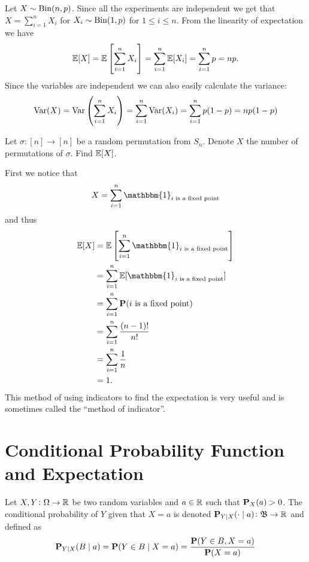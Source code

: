 \documentclass[11pt,a4paper]{article}
\begin{document}
  \begin{example}
    Let $X \sim \operatorname{Bin}(n,p)$. Since all the experiments are independent
    we get that $X = \sum_{i=1}^{n} X_i$ for $X_i \sim \operatorname{Bin}(1,p)$ for
    $1 \le i \le n$. From the linearity of expectation we have
    \[
      \mathbb{E}[X] =
      \mathbb{E}\left[\sum_{i=1}^{n} X_i\right] =
      \sum_{i=1}^{n} \mathbb{E}[X_i] =
      \sum_{i=1}^{n} p =
      np.
    \]
    Since the variables are independent we can also easily calculate
    the variance:
    \[
      \operatorname{Var}(X) =
      \operatorname{Var}\left(\sum_{i=1}^{n} X_i\right) =
      \sum_{i=1}^{n} \operatorname{Var}(X_i) =
      \sum_{i=1}^{n} p(1-p) =
      n p(1-p)
    \]
  \end{example}
  
  \begin{example}
    Let $\sigma \colon [n] \to [n]$ be a random permutation from $S_n$.
    Denote $X$ the number of permutations of $\sigma$. Find $\mathbb{E}[X]$.

    First we notice that
    \[
      X = \sum_{i=1}^{n} \mathbbm{1}_{i \text{ is a fixed point}}
    \]
    and thus
    \begin{align*}
      \E[X] &=
      \E\left[\sum_{i=1}^{n} \mathbbm{1}_{i \text{ is a fixed point}}\right] \\
      &= \sum_{i=1}^{n} \E[\mathbbm{1}_{i \text{ is a fixed point}}] \\
      &= \sum_{i=1}^{n} \Prob(i \text{ is a fixed point}) \\
      &= \sum_{i=1}^{n} \frac{(n-1)!}{n!} \\
      &= \sum_{i=1}^{n} \frac{1}{n} \\
      &= 1.
    \end{align*}
    This method of using indicators to find the expectation is very useful
    and is sometimes called the ``method of indicator''.
  \end{example}
  
  \newpage

  \section{Conditional Probability Function and Expectation}

  \begin{definition}
    Let $X,Y \colon \Omega \to \mathbb{R}$ be two random variables and $a \in \mathbb{R}$
    such that $\mathbf{P}_X(a) > 0$. The conditional probability of $Y$ given
    that $X = a$ is denoted 
    $\mathbf{P}_{Y \mid X}(\cdot \mid a) \colon \mathfrak B \to \mathbb{R}$ and defined as
    \[
      \mathbf{P}_{Y \mid X}(B \mid a) =
      \mathbf{P}(Y \in B \mid X = a) =
      \frac{\mathbf{P}(Y \in B, X = a)}{\mathbf{P}(X = a)}
    \]
  \end{definition}
  
\end{document}

